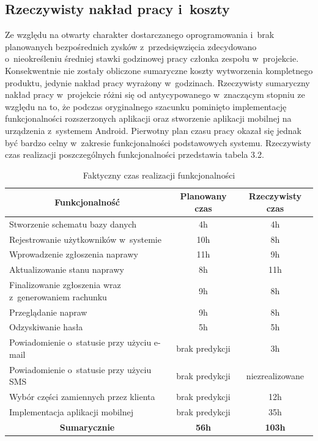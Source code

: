 \documentclass[a4paper,11pt]{article}
\begin{document}
\subsection{Rzeczywisty nakład pracy i~koszty}
Ze względu na otwarty charakter dostarczanego oprogramowania i~brak planowanych bezpośrednich zysków z~przedsięwzięcia zdecydowano o~nieokreśleniu średniej stawki godzinowej pracy członka zespołu w~projekcie. Konsekwentnie nie zostały obliczone sumaryczne koszty wytworzenia kompletnego produktu, jedynie nakład pracy wyrażony w~godzinach.
Rzeczywisty sumaryczny nakład pracy w~projekcie różni się od antycypowanego w~znaczącym stopniu ze względu na to, że podczas oryginalnego szacunku pominięto implementację funkcjonalności rozszerzonych aplikacji oraz stworzenie aplikacji mobilnej na urządzenia z~systemem Android. Pierwotny plan czasu pracy okazał się jednak być bardzo celny w~zakresie funkcjonalności podstawowych systemu. Rzeczywisty czas realizacji poszczególnych funkcjonalności  przedstawia tabela 3.2.
\begin{table}[H]
	\centering
	\caption{Faktyczny czas realizacji funkcjonalności}
	\bgroup
	\begin{tabular}{|l|c|c|}
		\hline
		\multicolumn{1}{|c|}{\textbf{Funkcjonalność}} & \textbf{Planowany czas} &\textbf{Rzeczywisty czas}\\ \hline \hline
		Stworzenie schematu bazy danych & 4h & 4h\\ \hline
		Rejestrowanie użytkowników w~systemie & 10h & 8h \\ \hline
		Wprowadzenie zgłoszenia naprawy & 11h & 9h \\ \hline
		Aktualizowanie stanu naprawy & 8h & 11h\\ \hline
		Finalizowanie zgłoszenia wraz z~generowaniem rachunku & 9h & 8h \\ \hline
		Przeglądanie napraw & 9h  & 8h\\ \hline
		Odzyskiwanie hasła & 5h & 5h\\ \hline
		Powiadomienie o~statusie przy użyciu e-mail & brak predykcji & 3h\\ \hline
		Powiadomienie o~statusie przy użyciu SMS & brak predykcji & niezrealizowane\\ \hline
		Wybór części zamiennych przez klienta & brak predykcji & 12h\\ \hline
		Implementacja aplikacji mobilnej & brak predykcji & 35h\\ \hline \hline
		\multicolumn{1}{|c|}{\textbf{Sumarycznie}} & \textbf{56h} & \textbf{103h} \\ \hline
	\end{tabular}
	\egroup
\end{table}
\end{document}
